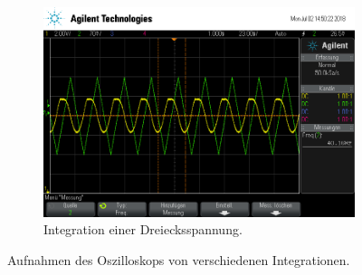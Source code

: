 \begin{figure}[ht]
\begin{subfigure}[]{\textwidth}
    \label{subfig:int_rechteck}
  \end{subfigure}
  \begin{subfigure}[]{\textwidth}
    \centering
    \includegraphics[height=0.3\textheight]{data/scope_264.png}
    \caption{Integration einer Dreiecksspannung.}
    \label{subfig:int_dreieck}
  \end{subfigure}
  \caption{Aufnahmen des Oszilloskops von verschiedenen Integrationen.}
  \label{fig:integrationen}
\end{figure}

